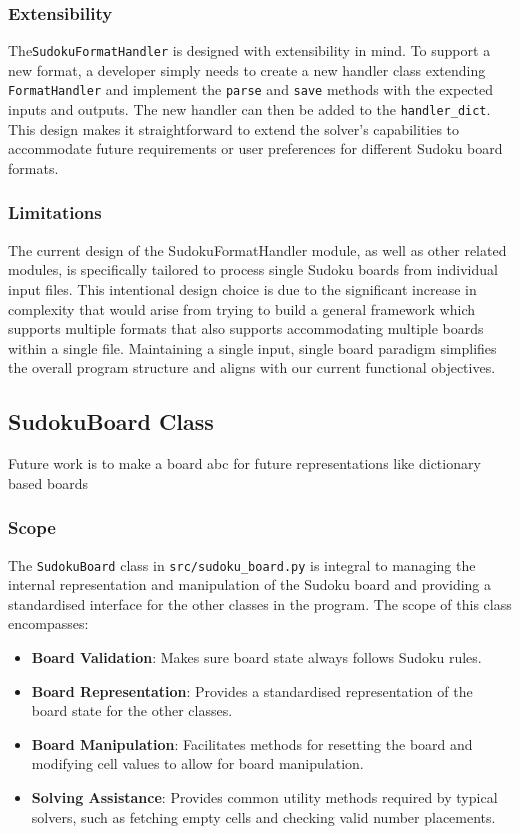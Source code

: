 \documentclass[11pt]{article}
\begin{document}
\subsubsection{Extensibility}
The\texttt{SudokuFormatHandler} is designed with extensibility in mind. To support a new format, a developer simply needs to create a new handler class extending \texttt{FormatHandler} and implement the \texttt{parse} and \texttt{save} methods with the expected inputs and outputs. The new handler can then be added to the \texttt{handler\_dict}. This design makes it straightforward to extend the solver's capabilities to accommodate future requirements or user preferences for different Sudoku board formats.


\subsubsection{Limitations}
The current design of the SudokuFormatHandler module, as well as other related modules, is specifically tailored to process single Sudoku boards from individual input files. This intentional design choice is due to the significant increase in complexity that would arise from trying to build a general framework which supports multiple formats that also supports accommodating multiple boards within a single file. Maintaining a single input, single board paradigm simplifies the overall program structure and aligns with our current functional objectives. 


\subsection{SudokuBoard Class}
Future work is to make a board abc for future representations like dictionary based boards

\subsubsection{Scope}
The \texttt{SudokuBoard} class in \texttt{src/sudoku\_board.py} is integral to managing the internal representation and manipulation of the Sudoku board and providing a standardised interface for the other classes in the program. The scope of this class encompasses:

\begin{itemize}
    \item \textbf{Board Validation}: Makes sure board state always follows Sudoku rules. 
    \item \textbf{Board Representation}: Provides a standardised representation of the board state for the other classes. 
    \item \textbf{Board Manipulation}: Facilitates methods for resetting the board and modifying cell values to allow for board manipulation.
    \item \textbf{Solving Assistance}: Provides common utility methods required by typical solvers, such as fetching empty cells and checking valid number placements.

\end{itemize}
\end{document}
